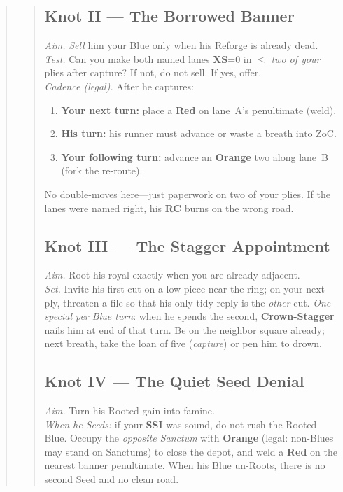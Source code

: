 \documentclass[11pt]{article}
\begin{document}
\begin{quote}
\begin{quote}
\subsection*{Knot II — The Borrowed Banner}
\emph{Aim.} \emph{Sell} him your Blue only when his Reforge is already dead.\\
\emph{Test.} Can you make both named lanes \textbf{XS}=0 in \(\le\) \emph{two of your} plies after capture? If not, do not sell. If yes, offer.\\
\emph{Cadence (legal).} After he captures:
\begin{enumerate}\itemsep0.15em
  \item \textbf{Your next turn:} place a \textbf{Red} on lane~A’s penultimate (weld).
  \item \textbf{His turn:} his runner must advance or waste a breath into ZoC.
  \item \textbf{Your following turn:} advance an \textbf{Orange} two along lane~B (fork the re-route).
\end{enumerate}
No double-moves here—just paperwork on two of your plies. If the lanes were named right, his \textbf{RC} burns on the wrong road.

\subsection*{Knot III — The Stagger Appointment}
\emph{Aim.} Root his royal exactly when you are already adjacent.\\
\emph{Set.} Invite his first cut on a low piece near the ring; on your next ply, threaten a file so that his only tidy reply is the \emph{other} cut. \emph{One special per Blue turn}: when he spends the second, \textbf{Crown-Stagger} nails him at end of that turn. Be on the neighbor square already; next breath, take the loan of five (\emph{capture}) or pen him to drown.

\subsection*{Knot IV — The Quiet Seed Denial}
\emph{Aim.} Turn his Rooted gain into famine.\\
\emph{When he Seeds:} if your \textbf{SSI} was sound, do not rush the Rooted Blue. Occupy the \emph{opposite Sanctum} with \textbf{Orange} (legal: non-Blues may stand on Sanctums) to close the depot, and weld a \textbf{Red} on the nearest banner penultimate. When his Blue un-Roots, there is no second Seed and no clean road.


\end{quote}
\end{quote}
\end{document}
